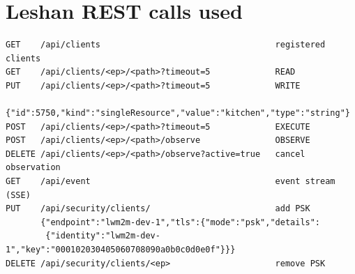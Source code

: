 \documentclass[11pt,a4paper]{article}
\begin{document}
\section{Leshan REST calls used}
\begin{lstlisting}
GET    /api/clients                                   registered clients
GET    /api/clients/<ep>/<path>?timeout=5             READ
PUT    /api/clients/<ep>/<path>?timeout=5             WRITE
       {"id":5750,"kind":"singleResource","value":"kitchen","type":"string"}
POST   /api/clients/<ep>/<path>?timeout=5             EXECUTE
POST   /api/clients/<ep>/<path>/observe               OBSERVE
DELETE /api/clients/<ep>/<path>/observe?active=true   cancel observation
GET    /api/event                                     event stream (SSE)
PUT    /api/security/clients/                         add PSK
       {"endpoint":"lwm2m-dev-1","tls":{"mode":"psk","details":
        {"identity":"lwm2m-dev-1","key":"000102030405060708090a0b0c0d0e0f"}}}
DELETE /api/security/clients/<ep>                     remove PSK
\end{lstlisting}
\end{document}
